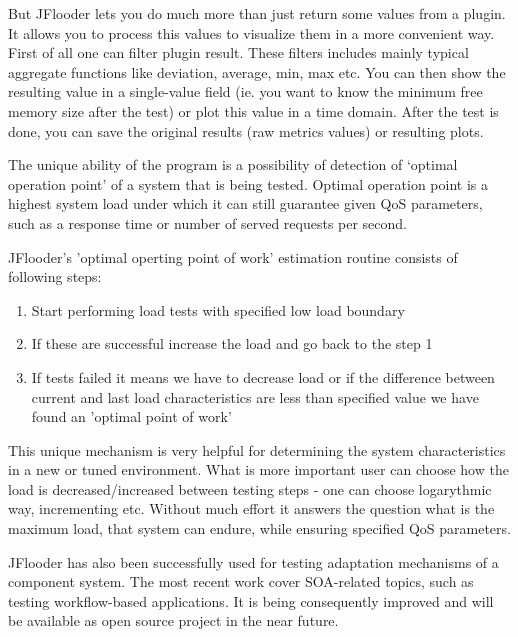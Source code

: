 \documentclass{article}
\begin{document}
But JFlooder lets you do much more than just return some values from a plugin.
It allows you to process this values to visualize them in a more convenient way.
First of all one can filter plugin result.
These filters includes mainly typical aggregate functions like deviation, average, min, max etc.
You can then show the resulting value in a single-value field (ie. you want to know the minimum free memory size after the test) or plot this value in a time domain.
After the test is done, you can save the original results (raw metrics values) or resulting plots. 

The unique ability of the program is a possibility of detection of ‘optimal operation point’ of a system that is being tested. 
Optimal operation point is a highest system load under which it can still guarantee given QoS parameters, such as a response time or number of served requests per second. 

JFlooder's 'optimal operting point of work' estimation routine consists of following steps:
\begin{enumerate}
\item{Start performing load tests with specified low load boundary}
\item{If these are successful increase the load and go back to the step 1}
\item{If tests failed it means we have to decrease load or if the difference between current and last load characteristics are less than specified value we have found an 'optimal point of work'}
\end{enumerate}

This unique mechanism is very helpful for determining the system characteristics in a new or tuned environment. 
What is more important user can choose how the load is decreased/increased between testing steps - one can choose logarythmic way, incrementing etc.
Without much effort it answers the question what is the maximum load, that system can endure, while ensuring specified QoS parameters. 

JFlooder has also been successfully used for testing adaptation mechanisms of a component system. 
The most recent work cover SOA-related topics, such as testing workflow-based applications.
It is being consequently improved and will be available as open source project in the near future. 
\end{document}
